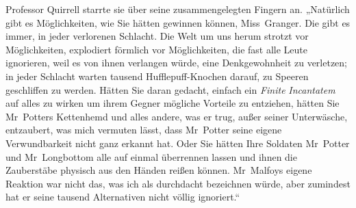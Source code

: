 Professor Quirrell starrte sie über seine zusammengelegten Fingern an. „Natürlich gibt es Möglichkeiten, wie Sie hätten gewinnen können, Miss~Granger. Die gibt es immer, in jeder verlorenen Schlacht. Die Welt um uns herum strotzt vor Möglichkeiten, explodiert förmlich vor Möglichkeiten, die fast alle Leute ignorieren, weil es von ihnen verlangen würde, eine Denkgewohnheit zu verletzen; in jeder Schlacht warten tausend Hufflepuff-Knochen darauf, zu Speeren geschliffen zu werden. Hätten Sie daran gedacht, einfach ein \emph{Finite} \emph{Incantatem} auf alles zu wirken um ihrem Gegner mögliche Vorteile zu entziehen, hätten Sie Mr~Potters Kettenhemd und alles andere, was er trug, außer seiner Unterwäsche, entzaubert, was mich vermuten lässt, dass Mr~Potter seine eigene Verwundbarkeit nicht ganz erkannt hat. Oder Sie hätten Ihre Soldaten Mr~Potter und Mr~Longbottom alle auf einmal überrennen lassen und ihnen die Zauberstäbe physisch aus den Händen reißen können. Mr~Malfoys eigene Reaktion war nicht das, was ich als durchdacht bezeichnen würde, aber zumindest hat er seine tausend Alternativen nicht völlig ignoriert.“
